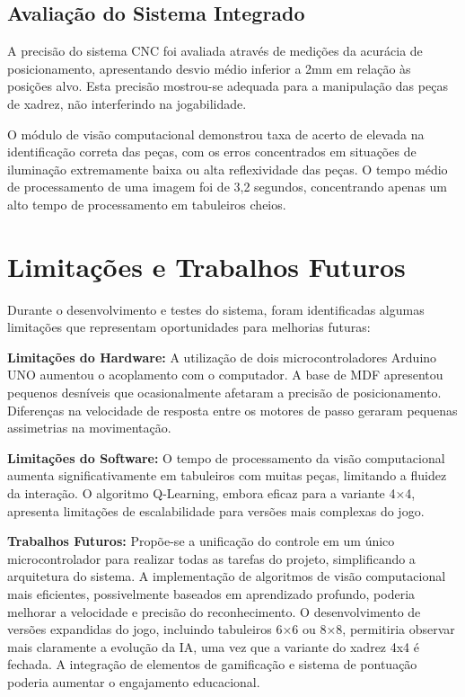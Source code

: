 \documentclass[a4paper]{ifacconf}
\begin{document}
\subsection{Avaliação do Sistema Integrado}

\par\noindent A precisão do sistema CNC foi avaliada através de medições da acurácia de posicionamento, apresentando desvio médio inferior a 2mm em relação às posições alvo. Esta precisão mostrou-se adequada para a manipulação das peças de xadrez, não interferindo na jogabilidade.

\par\noindent O módulo de visão computacional demonstrou taxa de acerto de elevada na identificação correta das peças, com os erros concentrados em situações de iluminação extremamente baixa ou alta reflexividade das peças. O tempo médio de processamento de uma imagem foi de 3,2 segundos, concentrando apenas um alto tempo de processamento em tabuleiros cheios.

\section{Limitações e Trabalhos Futuros}

\par\noindent Durante o desenvolvimento e testes do sistema, foram identificadas algumas limitações que representam oportunidades para melhorias futuras:

\par\noindent \textbf{Limitações do Hardware:} A utilização de dois microcontroladores Arduino UNO aumentou o acoplamento com o computador. A base de MDF apresentou pequenos desníveis que ocasionalmente afetaram a precisão de posicionamento. Diferenças na velocidade de resposta entre os motores de passo geraram pequenas assimetrias na movimentação.

\par\noindent \textbf{Limitações do Software:} O tempo de processamento da visão computacional aumenta significativamente em tabuleiros com muitas peças, limitando a fluidez da interação. O algoritmo Q-Learning, embora eficaz para a variante 4×4, apresenta limitações de escalabilidade para versões mais complexas do jogo.

\par\noindent \textbf{Trabalhos Futuros:} Propõe-se a unificação do controle em um único microcontrolador para realizar todas as tarefas do projeto, simplificando a arquitetura do sistema. A implementação de algoritmos de visão computacional mais eficientes, possivelmente baseados em aprendizado profundo, poderia melhorar a velocidade e precisão do reconhecimento. O desenvolvimento de versões expandidas do jogo, incluindo tabuleiros 6×6 ou 8×8, permitiria observar mais claramente a evolução da IA, uma vez que a variante do xadrez 4x4 é fechada. A integração de elementos de gamificação e sistema de pontuação poderia aumentar o engajamento educacional.
\end{document}
